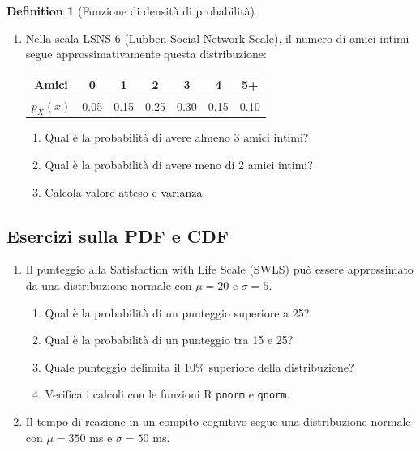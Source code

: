 \documentclass[
  letterpaper,
  DIV=11,
  numbers=noendperiod,
  oneside]{scrreprt}
\providecommand{\tightlist}{%
  \setlength{\itemsep}{0pt}\setlength{\parskip}{0pt}}
\theoremstyle{definition}
\theoremstyle{plain}
\theoremstyle{definition}
\newtheorem{definition}{Definition}[chapter]
\theoremstyle{remark}
\begin{document}
\begin{definition}[Funzione di densità di
probabilità]
\begin{tcolorbox}
\begin{enumerate}
  \begin{enumerate}
  \def\labelenumii{\alph{enumii}.}
  \tightlist
  \item
    Calcola \(P(X \geq 3)\).
  \item
    Calcola \(P(2 \leq X \leq 4)\).
  \item
    Calcola il valore atteso \(\mathbb{E}[X]\).
  \item
    Costruisci la CDF e rappresentala graficamente.
  \end{enumerate}
\item
  Nella scala LSNS-6 (Lubben Social Network Scale), il numero di amici
  intimi segue approssimativamente questa distribuzione:

  \begin{longtable}[]{@{}ccccccc@{}}
  \toprule\noalign{}
  Amici & 0 & 1 & 2 & 3 & 4 & 5+ \\
  \midrule\noalign{}
  \endhead
  \bottomrule\noalign{}
  \endlastfoot
  \(p_X(x)\) & 0.05 & 0.15 & 0.25 & 0.30 & 0.15 & 0.10 \\
  \end{longtable}

  \begin{enumerate}
  \def\labelenumii{\alph{enumii}.}
  \tightlist
  \item
    Qual è la probabilità di avere almeno 3 amici intimi?
  \item
    Qual è la probabilità di avere meno di 2 amici intimi?
  \item
    Calcola valore atteso e varianza.
  \end{enumerate}
\end{enumerate}

\subsection*{Esercizi sulla PDF e CDF}\label{esercizi-sulla-pdf-e-cdf}

\begin{enumerate}
\def\labelenumi{\arabic{enumi}.}
\setcounter{enumi}{5}
\item
  Il punteggio alla Satisfaction with Life Scale (SWLS) può essere
  approssimato da una distribuzione normale con \(\mu = 20\) e
  \(\sigma = 5\).

  \begin{enumerate}
  \def\labelenumii{\alph{enumii}.}
  \tightlist
  \item
    Qual è la probabilità di un punteggio superiore a 25?
  \item
    Qual è la probabilità di un punteggio tra 15 e 25?
  \item
    Quale punteggio delimita il 10\% superiore della distribuzione?
  \item
    Verifica i calcoli con le funzioni R \texttt{pnorm} e
    \texttt{qnorm}.
  \end{enumerate}
\item
  Il tempo di reazione in un compito cognitivo segue una distribuzione
  normale con \(\mu = 350\) ms e \(\sigma = 50\) ms.


\end{enumerate}
\end{tcolorbox}
\end{definition}
\end{document}
